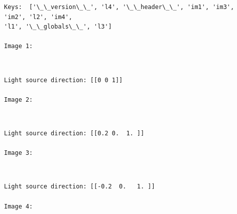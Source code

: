 \documentclass[11pt]{article}
\begin{document}
    \begin{Verbatim}[commandchars=\\\{\}]
Keys:  ['\_\_version\_\_', 'l4', '\_\_header\_\_', 'im1', 'im3', 'im2', 'l2', 'im4',
'l1', '\_\_globals\_\_', 'l3']

Image 1:
\end{Verbatim}

    \begin{center}
    \end{center}
    { \hspace*{\fill} \\}
    
    \begin{Verbatim}[commandchars=\\\{\}]
Light source direction: [[0 0 1]]

Image 2:
\end{Verbatim}

    \begin{center}
    \end{center}
    { \hspace*{\fill} \\}
    
    \begin{Verbatim}[commandchars=\\\{\}]
Light source direction: [[0.2 0.  1. ]]

Image 3:
\end{Verbatim}

    \begin{center}
    \end{center}
    { \hspace*{\fill} \\}
    
    \begin{Verbatim}[commandchars=\\\{\}]
Light source direction: [[-0.2  0.   1. ]]

Image 4:
\end{Verbatim}

    \begin{center}
    \end{center}
    { \hspace*{\fill} \\}
    
\end{document}
